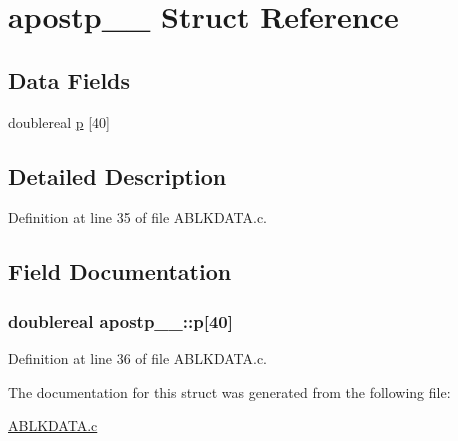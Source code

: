 \hypertarget{structapostp__1__}{}\section{apostp\+\_\+\_\+ Struct Reference}
\label{structapostp__1__}
\subsection*{Data Fields}
\begin{DoxyCompactItemize}
\item 
doublereal \hyperlink{structapostp__1___adb336899e543cb22cc433c933a69f961}{p} \mbox{[}40\mbox{]}
\end{DoxyCompactItemize}


\subsection{Detailed Description}


Definition at line 35 of file A\+B\+L\+K\+D\+A\+T\+A.\+c.



\subsection{Field Documentation}
\subsubsection[{\texorpdfstring{p}{p}}]{\setlength{\rightskip}{0pt plus 5cm}doublereal apostp\+\_\+\_\+\+::p\mbox{[}40\mbox{]}}\hypertarget{structapostp__1___adb336899e543cb22cc433c933a69f961}{}\label{structapostp__1___adb336899e543cb22cc433c933a69f961}


Definition at line 36 of file A\+B\+L\+K\+D\+A\+T\+A.\+c.



The documentation for this struct was generated from the following file\+:\begin{DoxyCompactItemize}
\item 
\hyperlink{ABLKDATA_8c}{A\+B\+L\+K\+D\+A\+T\+A.\+c}\end{DoxyCompactItemize}
